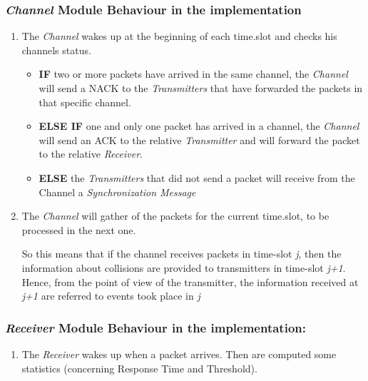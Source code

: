 \subsubsection{\textit{Channel} Module Behaviour in the implementation}
\begin{enumerate}
	\item The \textit{Channel} wakes up at the beginning of each time.slot and checks his channels status.
	\begin{itemize}
		\item \textbf{IF} two or more packets have arrived in the same channel, the \textit{Channel} will send a NACK to the \textit{Transmitters} that have forwarded the packets in that specific channel.
		\item \textbf{ELSE IF} one and only one packet has arrived in a channel, the \textit{Channel} will send an ACK to the relative \textit{Transmitter} and will forward the packet to the relative \textit{Receiver}.
		\item \textbf{ELSE} the \textit{Transmitters} that did not send a packet will receive from the Channel a \textit{Synchronization Message}
	\end{itemize}
	\item The \textit{Channel} will gather of the packets for the current time.slot, to be processed in the next one.
	
	\noindent So this means that if the channel receives packets in time-slot \emph{j}, then the information about collisions are provided to transmitters in time-slot \emph{j+1}. Hence, from the point of view of the transmitter, the information received at \emph{j+1} are referred to events took place in \emph{j}
\end{enumerate}
\subsubsection{\textit{Receiver} Module Behaviour in the implementation:}
\begin{enumerate}
	\item The \textit{Receiver} wakes up when a packet arrives. Then are computed some statistics (concerning Response Time and Threshold).
\end{enumerate}